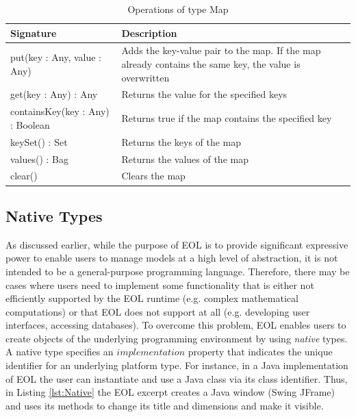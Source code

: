 \begin{longtable} {|p{5.5cm}|p{6.5cm}|}
			
			\caption{Operations of type Map}
			\label{tab:MapOperations}\\
			
			\hline
			
			\textbf{Signature} & \textbf{Description} \\\hline

			put(key : Any, value : Any) & Adds the key-value pair to the map. If the map already contains the same key, the value is overwritten\\\hline
				
			get(key : Any) : Any & Returns the value for the specified keys\\\hline
	
			containsKey(key : Any) : Boolean & Returns true if the map contains the specified key\\\hline
	
			keySet() : Set & Returns the keys of the map\\\hline
			
			values() : Bag & Returns the values of the map\\\hline
			
			clear() & Clears the map\\\hline
			
\end{longtable}

\subsection{Native Types}

As discussed earlier, while the purpose of EOL is to provide significant expressive power to enable users to manage models at a high level of abstraction, it is not intended to be a general-purpose programming language. Therefore, there may be cases where users need to implement some functionality that is either not efficiently supported by the EOL runtime (e.g. complex mathematical computations) or that EOL does not support at all (e.g. developing user interfaces, accessing databases). To overcome this problem, EOL enables users to create objects of the underlying programming environment by using \emph{native} types. A native type specifies an $implementation$ property that indicates the unique identifier for an underlying platform type. For instance, in a Java implementation of EOL the user can instantiate and use a Java class via its class identifier. Thus, in Listing \ref{lst:Native} the EOL excerpt creates a Java window (Swing JFrame) and uses its methods to change its title and dimensions and make it visible.

